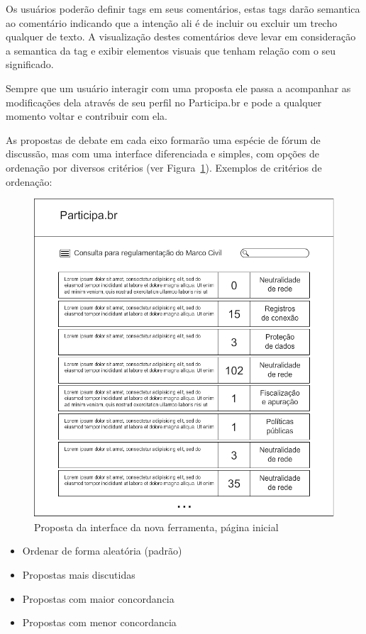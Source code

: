 \documentclass[12pt]{article}
\begin{document}
Os usuários poderão definir tags em seus comentários, estas tags darão
semantica ao comentário indicando que a intenção ali é de incluir ou
excluir um trecho qualquer de texto. A visualização destes comentários
deve levar em consideração a semantica da tag e exibir elementos visuais
que tenham relação com o seu significado.

Sempre que um usuário interagir com uma proposta ele passa a acompanhar as
modificações dela através de seu perfil no Participa.br e pode a qualquer
momento voltar e contribuir com ela.

As propostas de debate em cada eixo formarão uma espécie de fórum de
discussão, mas com uma interface diferenciada e simples, com opções de
ordenação por diversos critérios (ver
Figura~\ref{fig:pagina-inicial}). Exemplos de critérios de ordenação:

\begin{figure}[h]
\center
\includegraphics[scale=0.5]{01_-_pagina_inicial.png}
\caption{Proposta da interface da nova ferramenta, página inicial}
\label{fig:pagina-inicial}
\end{figure}

\begin{itemize}
  \item Ordenar de forma aleatória (padrão)
  \item Propostas mais discutidas
  \item Propostas com maior concordancia
  \item Propostas com menor concordancia
\end{itemize}
\end{document}
